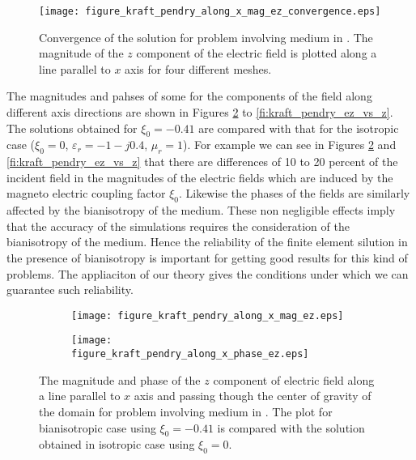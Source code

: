 \begin{figure}
\texttt{[image: figure\_kraft\_pendry\_along\_x\_mag\_ez\_convergence.eps]}
\caption{Convergence of the solution for problem involving medium in \cite{pendry2016acsphotonics}.
The magnitude of the $z$ component of the electric field is plotted 
along a line parallel to $x$ axis for four different meshes.}
\label{fi:kraft_pendry_convergence}
\end{figure}

The magnitudes and pahses of some for the components of the field 
along different axis directions are shown in 
Figures  \ref{fi:kraft_pendry_ez_vs_x} to \ref{fi:kraft_pendry_ez_vs_z}.
The solutions obtained for $\xi_0 = -0.41$ are compared with that 
for the isotropic case ($\xi_0 = 0$, $\varepsilon_r = -1 -j 0.4$, $\mu_r = 1$).
For example we can see in Figures \ref{fi:kraft_pendry_ez_vs_x} and \ref{fi:kraft_pendry_ez_vs_z}
that there are differences of 10 to 20 percent of the incident field in the 
magnitudes of the electric fields which are induced by the magneto electric coupling 
factor $\xi_0$.
Likewise the phases of the fields are similarly affected by the bianisotropy of the medium.
These non negligible effects imply that the accuracy of the simulations requires 
the consideration of the bianisotropy of the medium.
Hence the reliability of the finite element silution in the presence of bianisotropy is important 
for getting good results for this kind of problems.
The appliaciton of our theory gives the conditions under which we can guarantee such reliability.


\begin{figure}[H]
\centering
\begin{subfigure}[b]{0.49\textwidth}
\texttt{[image: figure\_kraft\_pendry\_along\_x\_mag\_ez.eps]}
\end{subfigure}
%
\begin{subfigure}[b]{0.49\textwidth}
\centering
\texttt{[image: figure\_kraft\_pendry\_along\_x\_phase\_ez.eps]}
\end{subfigure}
\caption{The magnitude and phase of the $z$ component of electric field along a line parallel to $x$ axis 
and passing though the center of gravity of the domain for problem involving 
medium in \cite{pendry2016acsphotonics}. 
The plot for bianisotropic case  using $\xi_0 = -0.41$ is compared with 
the solution obtained in isotropic case using $\xi_0 = 0$.}
\label{fi:kraft_pendry_ez_vs_x}
\end{figure}

